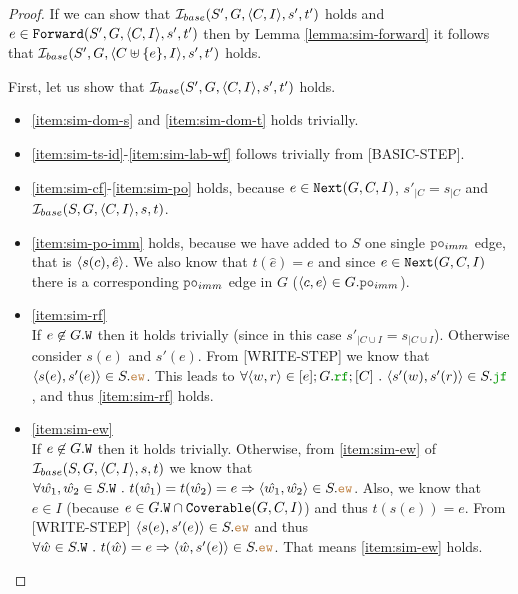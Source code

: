 \documentclass[12pt]{article}
\begin{document}
\begin{proof}
  If we can show that $\mathcal{I}_{base}(S', G, \langle C, I \rangle, s', t')$ holds and
  $e \in {\mathtt{Forward}}(S', G, \langle C, I \rangle, s', t')$ then by Lemma \ref{lemma:sim-forward}
  it follows that $\mathcal{I}_{base}(S', G, \langle C \uplus \{e\}, I \rangle, s', t')$ holds.

  First, let us show that $\mathcal{I}_{base}(S', G, \langle C, I \rangle, s', t')$ holds.

  \begin{itemize}

  \item \ref{item:sim-dom-s} and \ref{item:sim-dom-t} holds trivially.

  \item \ref{item:sim-ts-id}-\ref{item:sim-lab-wf} follows trivially from [BASIC-STEP].

  \item \ref{item:sim-cf}-\ref{item:sim-po} holds, because
    $e \in {\mathtt{Next}}(G, C, I)$,
    $s'_{|C} = s_{|C}$ and $\mathcal{I}_{base}(S, G, \langle C, I \rangle, s, t)$.

  \item \ref{item:sim-po-imm} holds, because we have added to $S$
    one single $\lPO_{imm}$ edge, that is $\langle s(c), \hat{e} \rangle$.
    We also know that $t(\hat{e}) = e$ and since $e \in {\mathtt{Next}}(G, C, I)$
    there is a corresponding $\lPO_{imm}$ edge in $G$ ($\tup{c, e} \in G.\lPO_{imm}$).

  \item \ref{item:sim-rf} \\
    If $e \not\in G.{\mathtt{W}}$ then it holds trivially
    (since in this case $s'_{|C \cup I} = s_{|C \cup I}$).
    Otherwise consider $s(e)$ and $s'(e)$.
    From [WRITE-STEP] we know that $\tup{s(e), s'(e)} \in S.\lEW$.
    This leads to 
    $\forall{\tup{w, r} \in [e];G.\lRF;[C]} ~.~ \tup{s'(w), s'(r)} \in S.\lJF$,
    and thus \ref{item:sim-rf} holds.

  \item \ref{item:sim-ew} \\
    If $e \not\in G.{\mathtt{W}}$ then it holds trivially.
    Otherwise, from \ref{item:sim-ew} of $\mathcal{I}_{base}(S, G, \langle C, I \rangle, s, t)$ we know that
    $\forall{\hat{w_1}, \hat{w_2} \in S.\lW} ~.~ t(\hat{w_1}) = t(\hat{w_2}) = e
    \Rightarrow \tup{\hat{w_1}, \hat{w_2}} \in S.\lEW$.
    Also, we know that $e \in I$ (because $e \in G.{\mathtt{W}} \cap {\mathtt{Coverable}}(G, C, I)$)
    and thus $t(s(e)) = e$.
    From [WRITE-STEP] $\tup{s(e), s'(e)} \in S.\lEW$ and thus
    $\forall{\hat{w} \in S.\lW}~.~ t(\hat{w}) = e \Rightarrow \tup{\hat{w}, s'(e)} \in S.\lEW$.
    That means \ref{item:sim-ew} holds.
  

\end{itemize}
\end{proof}
\end{document}
